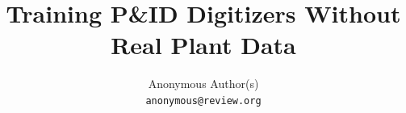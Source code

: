 \documentclass[10pt,twocolumn,letterpaper]{article}
\title{Training P\&ID Digitizers Without Real Plant Data}
\author{Anonymous Author(s)\\
{\tt\small anonymous@review.org}
}
\begin{document}
\maketitle








{\small


}



% 
\end{document}
